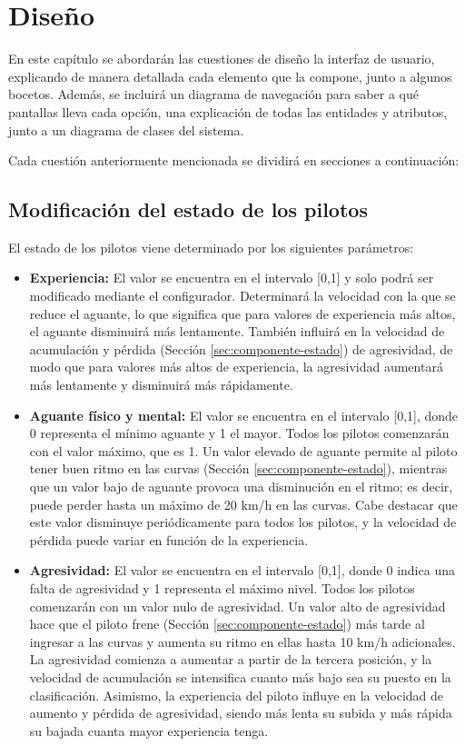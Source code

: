 \chapter{Diseño}

En este capítulo se abordarán las cuestiones de diseño la interfaz de usuario, explicando de manera detallada cada elemento que la compone, junto a algunos bocetos. Además, se incluirá un diagrama de navegación para saber a qué pantallas lleva cada opción, una explicación de todas las entidades y atributos, junto a un diagrama de clases del sistema.

\bigskip

Cada cuestión anteriormente mencionada se dividirá en secciones a continuación:

\section{Modificación del estado de los pilotos}
\label{sec:mod-estado-piloto}
El estado de los pilotos viene determinado por los siguientes parámetros:

\begin{itemize}
    \item \textbf{Experiencia: }El valor se encuentra en el intervalo [0,1] y solo podrá ser modificado mediante el configurador. Determinará la velocidad con la que se reduce el aguante, lo que significa que para valores de experiencia más altos, el aguante disminuirá más lentamente. También influirá en la velocidad de acumulación y pérdida (Sección \ref{sec:componente-estado}) de agresividad, de modo que para valores más altos de experiencia, la agresividad aumentará más lentamente y disminuirá más rápidamente.
    
    \item \textbf{Aguante físico y mental: }El valor se encuentra en el intervalo [0,1], donde 0 representa el mínimo aguante y 1 el mayor. Todos los pilotos comenzarán con el valor máximo, que es 1. Un valor elevado de aguante permite al piloto tener buen ritmo en las curvas (Sección \ref{sec:componente-estado}), mientras que un valor bajo de aguante provoca una disminución en el ritmo; es decir, puede perder hasta un máximo de 20 km/h en las curvas. Cabe destacar que este valor disminuye periódicamente para todos los pilotos, y la velocidad de pérdida puede variar en función de la experiencia.
    
    \item \textbf{Agresividad: }El valor se encuentra en el intervalo [0,1], donde 0 indica una falta de agresividad y 1 representa el máximo nivel. Todos los pilotos comenzarán con un valor nulo de agresividad. Un valor alto de agresividad hace que el piloto frene (Sección \ref{sec:componente-estado}) más tarde al ingresar a las curvas y aumenta su ritmo en ellas hasta 10 km/h adicionales. La agresividad comienza a aumentar a partir de la tercera posición, y la velocidad de acumulación se intensifica cuanto más bajo sea su puesto en la clasificación. Asimismo, la experiencia del piloto influye en la velocidad de aumento y pérdida de agresividad, siendo más lenta su subida y más rápida su bajada cuanta mayor experiencia tenga.
\end{itemize}

